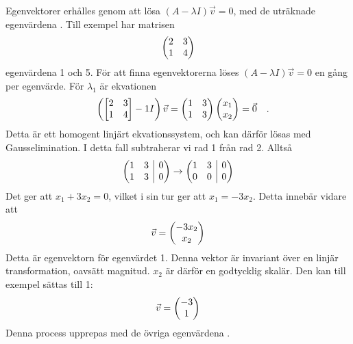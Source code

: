 Egenvektorer erhålles genom att lösa \((A-\lambda I)\vec{v}=0\), med de uträknade egenvärdena \parencite{kuttler_71_2022}. Till exempel har matrisen
\begin{equation*}
    \begin{pmatrix}
        2 & 3\\
        1 & 4
    \end{pmatrix}
\end{equation*}
egenvärdena 1 och 5. För att finna egenvektorerna löses \((A-\lambda I)\vec{v}=0\) en gång per egenvärde. För \(\lambda_1\) är ekvationen
\begin{equation}
    \left(\begin{bmatrix}
        2 & 3\\
        1 & 4
    \end{bmatrix}
    -1I\right)\vec{v}=\begin{pmatrix}
        1 & 3\\
        1 & 3
    \end{pmatrix}
    \begin{pmatrix}x_1\\x_2\end{pmatrix}=\vec{0}
\quad\mathrm{.}\!\!\!\!\!\!\end{equation} Detta är ett homogent linjärt ekvationssystem, och kan därför lösas med Gausselimination. I detta fall subtraherar vi rad 1 från rad 2. Alltså
\begin{equation}
    \begin{array}({@{}cc|c@{}})
        1 & 3 & 0 \\
        1 & 3 & 0
    \end{array}
    \rightarrow
    \begin{array}({@{}cc|c@{}})
        1 & 3 & 0 \\
        0 & 0 & 0
    \end{array}
\end{equation}
Det ger att \(x_1+3x_2=0\), vilket i sin tur ger att \(x_1=-3x_2\). Detta innebär vidare att
\begin{equation}
    \vec{v}=\begin{pmatrix}
        -3x_2\\
        x_2
    \end{pmatrix}
\end{equation} Detta är egenvektorn för egenvärdet 1. Denna vektor är invariant över en linjär transformation, oavsätt magnitud. \(x_2\) är därför en godtycklig skalär. Den kan till  exempel sättas till 1:
\begin{equation}
    \vec{v}=\begin{pmatrix}-3\\1\end{pmatrix}
\end{equation}
Denna process upprepas med de övriga egenvärdena \parencite{kuttler_71_2022}.

